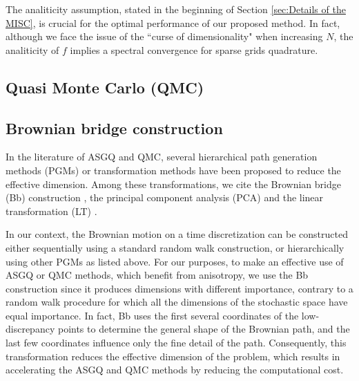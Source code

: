 \FloatBarrier

\begin{remark}
The analiticity assumption, stated in the beginning of Section \ref{sec:Details of the MISC}, is crucial for the optimal performance of our proposed method. In fact, although we face the issue of the  ``curse of dimensionality" when increasing $N$, the analiticity of $f$ implies a spectral convergence for sparse grids quadrature.
\end{remark} 
%


%

\subsection{Quasi Monte Carlo (QMC)}\label{sec:Quasi Monte Carlo (QMC)}

\subsection{Brownian bridge construction}\label{sec:Brwonian bridge construction}
In the literature of ASGQ and  QMC, several hierarchical path generation methods (PGMs) or transformation methods have been proposed to reduce the effective dimension. Among these transformations, we cite  the Brownian bridge (Bb)  construction \cite{morokoff1994quasi,moskowitz1996smoothness,caflisch1997valuation}, the principal component analysis (PCA)  \cite{acworth1998comparison} and the linear transformation (LT) \cite{imai2004minimizing}.

In our context, the Brownian motion on a time discretization  can be constructed either sequentially using a standard random walk construction, or hierarchically using   other PGMs as listed above. For our purposes, to make an effective use of ASGQ or QMC methods, which benefit from anisotropy, we use the Bb construction since it produces  dimensions with different importance, contrary to a random walk procedure for which all the dimensions of the stochastic space have equal importance. In fact, Bb uses the first several coordinates of the low-discrepancy points to determine the general shape of the Brownian path, and the last few coordinates influence only the fine detail of the path. Consequently, this transformation  reduces the effective dimension  of the problem, which results in accelerating the ASGQ and QMC methods by reducing the computational cost.

